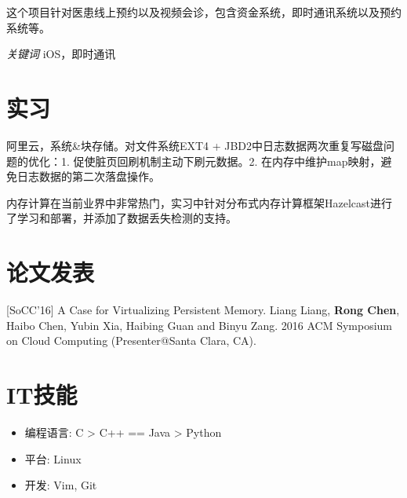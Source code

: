 \documentclass{resume}
\begin{document}
这个项目针对医患线上预约以及视频会诊，包含资金系统，即时通讯系统以及预约系统等。

\textit{关键词} iOS，即时通讯

%



\section{实习}
阿里云，系统\&块存储。对文件系统EXT4 + JBD2中日志数据两次重复写磁盘问题的优化：1. 促使脏页回刷机制主动下刷元数据。2. 在内存中维护map映射，避免日志数据的第二次落盘操作。


内存计算在当前业界中非常热门，实习中针对分布式内存计算框架Hazelcast进行了学习和部署，并添加了数据丢失检测的支持。


\section{论文发表}
[SoCC'16] A Case for Virtualizing Persistent Memory. Liang Liang, \textbf{Rong Chen}, Haibo Chen, Yubin Xia, Haibing Guan and Binyu Zang. 2016 ACM Symposium on Cloud Computing (Presenter@Santa Clara, CA).

\section{IT技能}
\begin{itemize}[parsep=0.5ex]
  \item 编程语言: C > C++ == Java > Python
  \item 平台: Linux
  \item 开发: Vim, Git
\end{itemize}

%
%
\end{document}
